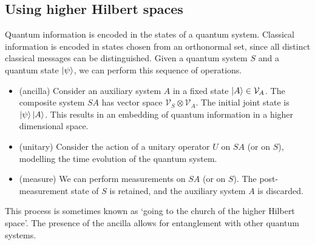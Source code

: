 \subsection{Using higher Hilbert spaces}
Quantum information is encoded in the states of a quantum system.
Classical information is encoded in states chosen from an orthonormal set, since all distinct classical messages can be distinguished.
Given a quantum system \( S \) and a quantum state \( \ket{\psi} \), we can perform this sequence of operations.
\begin{itemize}
    \item (ancilla) Consider an auxiliary system \( A \) in a fixed state \( \ket{A} \in \mathcal V_A \).
    The composite system \( SA \) has vector space \( \mathcal V_S \otimes \mathcal V_A \).
    The initial joint state is \( \ket{\psi}\ket{A} \).
    This results in an embedding of quantum information in a higher dimensional space.
    \item (unitary) Consider the action of a unitary operator \( U \) on \( SA \) (or on \( S \)), modelling the time evolution of the quantum system.
    \item (measure) We can perform measurements on \( SA \) (or on \( S \)).
    The post-measurement state of \( S \) is retained, and the auxiliary system \( A \) is discarded.
\end{itemize}
This process is sometimes known as `going to the church of the higher Hilbert space'.
The presence of the ancilla allows for entanglement with other quantum systems.

